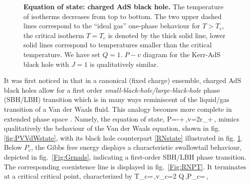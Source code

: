 \begin{figure}
\begin{center}
\caption{{\bf Equation of state: charged AdS black hole.}
The temperature of isotherms decreases from top to bottom. The two upper dashed lines correspond to the ``ideal gas'' one-phase behaviour for $T>T_c$, the critical isotherm $T=T_c$ is denoted by the thick solid line, lower solid lines correspond to temperatures smaller than the critical temperature.  We have set $Q=1$.  
$P-v$ diagram for the Kerr-AdS black hole with $J=1$ is qualitatively similar.
}\label{Fig:RNstate}
\end{center}
\end{figure} 
It was first noticed in \cite{ChamblinEtal:1999a,ChamblinEtal:1999b} that in a canonical (fixed charge) ensemble, charged AdS black holes allow for a first order {\em small-black-hole/large-black-hole} phase (SBH/LBH) transition which is in many ways reminiscent of the liquid/gas transition of a Van der Waals fluid.
This analogy becomes more complete in extended phase space \cite{KubiznakMann:2012}. 
Namely, the equation of state,
\be\label{RNstate}
P=-+\,,\quad v=2r_+\,,
\ee
mimics qualitatively the behaviour of the Van der Waals equation, shown in fig. \ref{fig:PVVdWstate}, with its black hole counterpart \eqref{RNstate} illustrated in fig. \ref{Fig:RNstate}.
Below $P_c$, the Gibbs free energy displays a characteristic swallowtail behaviour, depicted in fig.~\ref{Fig:Grnads}, indicating a first-order SBH/LBH phase transition. The corresponding coexistence line is displayed in fig.~\ref{Fig:RNPT}. 
It terminates at a critical critical point, characterized by 
\be
T_c=\,,\quad v_c=2 Q\,,\quad P_c=\,, 
